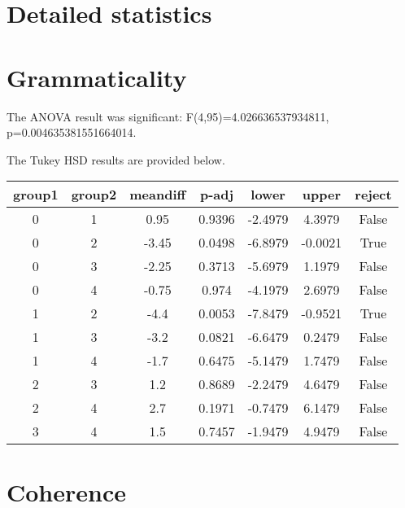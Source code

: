 \appendix \section{Detailed statistics}

\section{Grammaticality}

The ANOVA result was significant: F(4,95)=4.026636537934811, p=0.004635381551664014.

The Tukey HSD results are provided below.
\begin{center}
\begin{tabular}{ccccccc}
\toprule
\textbf{group1} & \textbf{group2} & \textbf{meandiff} & \textbf{p-adj} & \textbf{lower} & \textbf{upper} & \textbf{reject}  \\
\midrule
       0        &        1        &        0.95       &     0.9396     &    -2.4979     &     4.3979     &      False       \\
       0        &        2        &       -3.45       &     0.0498     &    -6.8979     &    -0.0021     &       True       \\
       0        &        3        &       -2.25       &     0.3713     &    -5.6979     &     1.1979     &      False       \\
       0        &        4        &       -0.75       &     0.974      &    -4.1979     &     2.6979     &      False       \\
       1        &        2        &        -4.4       &     0.0053     &    -7.8479     &    -0.9521     &       True       \\
       1        &        3        &        -3.2       &     0.0821     &    -6.6479     &     0.2479     &      False       \\
       1        &        4        &        -1.7       &     0.6475     &    -5.1479     &     1.7479     &      False       \\
       2        &        3        &        1.2        &     0.8689     &    -2.2479     &     4.6479     &      False       \\
       2        &        4        &        2.7        &     0.1971     &    -0.7479     &     6.1479     &      False       \\
       3        &        4        &        1.5        &     0.7457     &    -1.9479     &     4.9479     &      False       \\
\bottomrule
\end{tabular}
\end{center}\section{Coherence}

